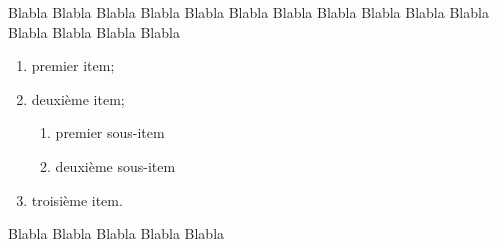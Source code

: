 \documentclass[12pt,a4paper]{article}
\begin{document}
Blabla Blabla Blabla Blabla Blabla Blabla Blabla Blabla Blabla Blabla
Blabla Blabla Blabla Blabla Blabla
\begin{enumerate}[label=\Alph*)]
\item premier item;
\item deuxième item;
\begin{enumerate}[label=\arabic*.]
\item premier sous-item
\item deuxième sous-item
\end{enumerate}
\item troisième item.
\end{enumerate}
Blabla Blabla Blabla Blabla Blabla
\end{document}
